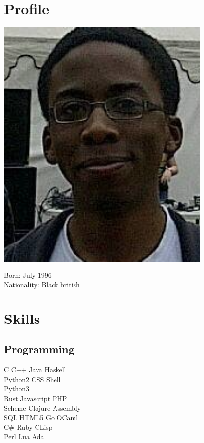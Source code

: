 \documentclass[11pt, a4paper]{cv}
\begin{document}
\begin{minipage}[t]{0.33\textwidth} %

\section{Profile}

\includegraphics[width=0.8\textwidth]{profile.png}

Born: July 1996 \\
Nationality: Black british

\section{Skills}

\subsection{Programming}

C \textbullet{} C++ \textbullet{} Java \textbullet{} Haskell \\
Python2 \textbullet{} CSS \textbullet{} Shell \\
Python3 \textbullet{} \LaTeXe\  \\\vspace{4pt}
Rust \textbullet{} Javascript \textbullet{} PHP \\
Scheme \textbullet{} Clojure \textbullet{} Assembly \\
SQL \textbullet{} {\small HTML5} \textbullet{} Go \textbullet{} OCaml \\\vspace{4pt}
C\# \textbullet{} Ruby \textbullet{} CLisp \\
Perl \textbullet{} Lua \textbullet{} Ada


\end{minipage}
\end{document}
